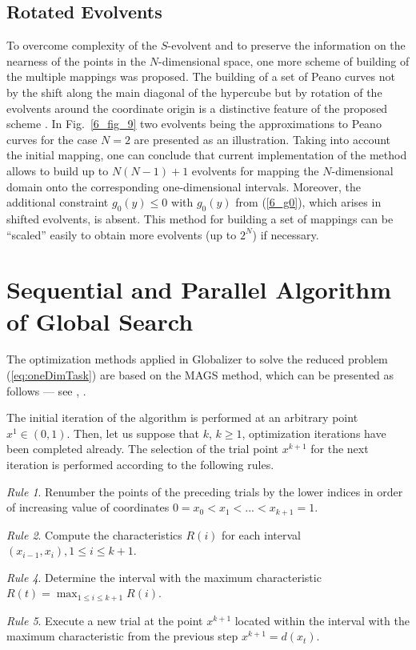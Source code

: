 \documentclass{svproc}
\begin{document}
\subsection{Rotated Evolvents}
To overcome complexity of the $S$-evolvent and to preserve the information on the nearness of the points in
the $N$-dimensional space, one more scheme of building of the multiple mappings was proposed.
The building of a set of Peano curves not by the shift along the main diagonal of the hypercube
but by rotation of the evolvents around the coordinate origin is a distinctive feature of the
proposed scheme \cite{Gergel2009}.
In Fig.~\ref{6_fig_9} two evolvents being the approximations to Peano curves for the case
$N=2$ are presented as an illustration.
Taking into account the initial mapping, one can conclude that current implementation of the
method allows to build up to $N(N-1)+1$ evolvents for mapping the $N$-dimensional domain
onto the corresponding one-dimensional intervals. Moreover, the additional constraint  $g_0(y)
\leq 0$ with $g_0(y)$ from (\ref{6_g0}), which arises in shifted evolvents, is absent. This
method for building a set of mappings can be ``scaled'' easily to obtain more evolvents (up to
$2^N$) if necessary.
\section{Sequential and Parallel Algorithm of Global Search}
The optimization methods applied in Globalizer to solve the reduced problem
(\ref{eq:oneDimTask}) are based on the MAGS method, which can be presented as follows ---
see \cite{strongin1978}, \cite{strSergGO}.
\par
The initial iteration of the algorithm is performed at an arbitrary point \mbox{\(x^1\in(0,1)\)}.
Then, let us suppose that \(k\), \(k\ge 1\), optimization iterations have been completed already.
The selection of the trial point \(x^{k+1}\) for the next iteration is performed according to the
following rules.

\textit{Rule 1}. Renumber the points of the preceding trials by the lower indices in order of
increasing value of coordinates
$0=x_0<x_1<...<x_{k+1}=1$.

\textit{Rule 2}. Compute the characteristics \(R(i)\) for each interval \((x_{i-1},x_i),1\leq i\leq
k+1\).

\textit{Rule 4}. Determine the interval with the maximum characteristic $R(t)=\max_{1\leq i
\leq k+1}R(i)$.

\textit{Rule 5}. Execute a new trial at the point \(x^{k+1}\) located within the interval with the
maximum characteristic from the previous step
  $x^{k+1}=d(x_t)$.
\end{document}
